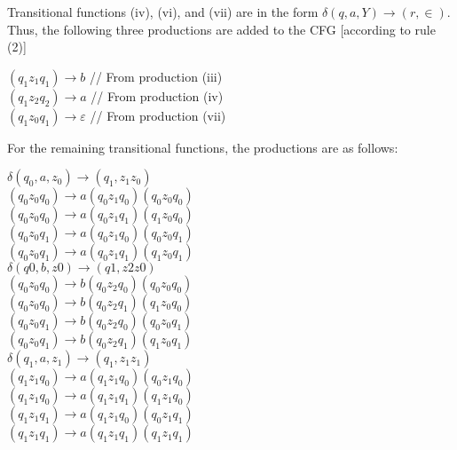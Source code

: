 \documentclass{article}
\begin{document}
\hspace*{0.5cm} Transitional functions (iv), (vi), and (vii) are in the form $\delta(q, a, Y) \rightarrow (r, \in)$. Thus, the following three
productions are added to the CFG [according to rule (2)]\\

\begin{center}
\hspace*{0.5cm} $(q_1 z_1 q_1) \rightarrow b$ // From production (iii) \\
\hspace*{0.5cm} $(q_1 z_2 q_2) \rightarrow a$ // From production (iv)\\
\hspace*{0.5cm} $(q_1 z_0 q_1) \rightarrow \varepsilon$ // From production (vii) \\
\end{center}

For the remaining transitional functions, the productions are as follows:\\


\begin{center}
$\delta(q_0, a, z_0) \rightarrow (q_1, z_1z_0)$ \\
 \hspace*{1cm} $(q_0 z_0 q_0) \rightarrow a(q_0 z_1 q_0) (q_0 z_0 q_0)$ \\
 \hspace*{1cm} $(q_0 z_0 q_0) \rightarrow a(q_0 z_1 q_1) (q_1 z_0 q_0)$ \\
 \hspace*{1cm} $(q_0 z_0 q_1) \rightarrow a(q_0 z_1 q_0) (q_0 z_0 q_1)$ \\
 \hspace*{1cm} $(q_0 z_0 q_1) \rightarrow a(q_0 z_1 q_1) (q_1 z_0 q_1)$ \\
$\delta(q0, b, z0) \rightarrow (q1, z2z0)$ \\
 \hspace*{1cm} $(q_0 z_0 q_0) \rightarrow b(q_0 z_2 q_0) (q_0 z_0 q_0)$ \\
 \hspace*{1cm} $(q_0 z_0 q_0) \rightarrow b(q_0 z_2 q_1) (q_1 z_0 q_0)$ \\
 \hspace*{1cm} $(q_0 z_0 q_1) \rightarrow b(q_0 z_2 q_0) (q_0 z_0 q_1)$ \\
 \hspace*{1cm} $(q_0 z_0 q_1) \rightarrow b(q_0 z_2 q_1) (q_1 z_0 q_1)$ \\
$\delta(q_1, a, z_1) \rightarrow (q_1, z_1z_1)$ \\
 \hspace*{1cm} $(q_1 z_1 q_0) \rightarrow a(q_1 z_1 q_0) (q_0 z_1 q_0)$ \\
 \hspace*{1cm} $(q_1 z_1 q_0) \rightarrow a(q_1 z_1 q_1) (q_1 z_1 q_0)$ \\
 \hspace*{1cm} $(q_1 z_1 q_1) \rightarrow a(q_1 z_1 q_0) (q_0 z_1 q_1)$ \\
 \hspace*{1cm} $(q_1 z_1 q_1) \rightarrow a(q_1 z_1 q_1) (q_1 z_1 q_1)$ \\
\end{center}
\end{document}
